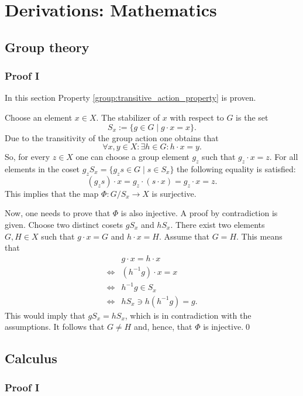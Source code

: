 \chapter{Derivations: Mathematics}

\section{Group theory}
\subsection{Proof I}\label{proof:stabilizer}

    In this section Property \ref{group:transitive_action_property} is proven.

    Choose an element $x\in X$. The stabilizer of $x$ with respect to $G$ is the set \[S_x := \{g\in G\mid g\cdot x = x\}.\] Due to the transitivity of the group action one obtains that \[\forall x, y\in X: \exists h\in G: h\cdot x = y.\] So, for every $z\in X$ one can choose a group element $g_z$ such that $g_z\cdot x = z$. For all elements in the coset $g_zS_x = \{g_zs\in G\mid s\in S_x\}$ the following equality is satisfied: \[(g_zs)\cdot x = g_z\cdot (s\cdot x) = g_z\cdot x = z.\] This implies that the map $\Phi:G/S_x \rightarrow X$ is surjective.

    Now, one needs to prove that $\Phi$ is also injective. A proof by contradiction is given. Choose two distinct cosets $gS_x$ and $hS_x$. There exist two elements $G,H\in X$ such that $g\cdot x = G$ and $h\cdot x = H$. Assume that $G = H$. This means that
    \begin{align*}
        &g\cdot x = h\cdot x\\
        \iff&(h^{-1}g)\cdot x = x\\
        \iff&h^{-1}g\in S_x\\
        \iff&hS_x\ni h(h^{-1}g) = g.
    \end{align*}
    This would imply that $gS_x = hS_x$, which is in contradiction with the assumptions. It follows that $G\neq H$ and, hence, that $\Phi$ is injective.\qed

\section{Calculus}
\subsection{Proof I}

